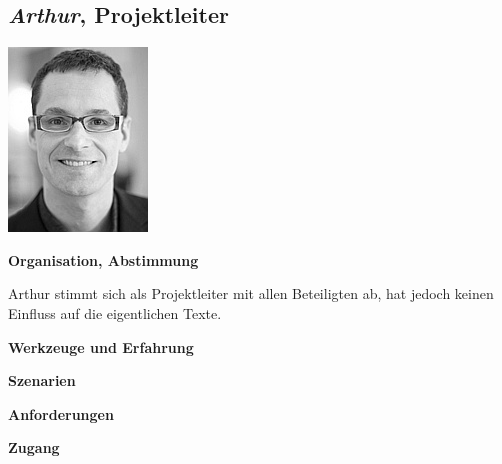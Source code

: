 \pagebreak

\subsection{\emph{Arthur}, Projektleiter}\label{p:arthur}

\begin{multicols}{2}

\begin{center}
\includegraphics[width=0.5\columnwidth]{media/arthur.jpg}
\end{center}


\textbf{Organisation, Abstimmung}

Arthur stimmt sich als Projektleiter mit allen Beteiligten ab, hat jedoch keinen Einfluss auf die eigentlichen Texte.

\textbf{Werkzeuge und Erfahrung}

\columnbreak

\textbf{Szenarien}

\textbf{Anforderungen}

\textbf{Zugang}

\end{multicols}

\pagebreak

